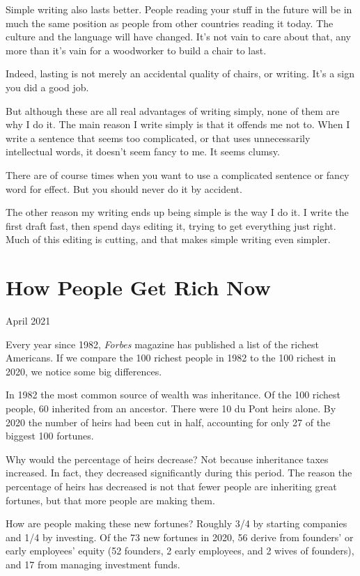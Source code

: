 \documentclass[12pt]{book}
\begin{document}
Simple writing also lasts better. People reading your stuff in the
future will be in much the same position as people from other countries
reading it today. The culture and the language will have changed. It's
not vain to care about that, any more than it's vain for a woodworker to
build a chair to last.

Indeed, lasting is not merely an accidental quality of chairs, or
writing. It's a sign you did a good job.

But although these are all real advantages of writing simply, none of
them are why I do it. The main reason I write simply is that it offends
me not to. When I write a sentence that seems too complicated, or that
uses unnecessarily intellectual words, it doesn't seem fancy to me. It
seems clumsy.

There are of course times when you want to use a complicated sentence or
fancy word for effect. But you should never do it by accident.

The other reason my writing ends up being simple is the way I do it. I
write the first draft fast, then spend days editing it, trying to get
everything just right. Much of this editing is cutting, and that makes
simple writing even simpler.
\chapter{How People Get Rich Now}

April 2021

Every year since 1982, \emph{Forbes} magazine has published a list of
the richest Americans. If we compare the 100 richest people in 1982 to
the 100 richest in 2020, we notice some big differences.

In 1982 the most common source of wealth was inheritance. Of the 100
richest people, 60 inherited from an ancestor. There were 10 du Pont
heirs alone. By 2020 the number of heirs had been cut in half,
accounting for only 27 of the biggest 100 fortunes.

Why would the percentage of heirs decrease? Not because inheritance
taxes increased. In fact, they decreased significantly during this
period. The reason the percentage of heirs has decreased is not that
fewer people are inheriting great fortunes, but that more people are
making them.

How are people making these new fortunes? Roughly 3/4 by starting
companies and 1/4 by investing. Of the 73 new fortunes in 2020, 56
derive from founders' or early employees' equity (52 founders, 2 early
employees, and 2 wives of founders), and 17 from managing investment
funds.
\end{document}
